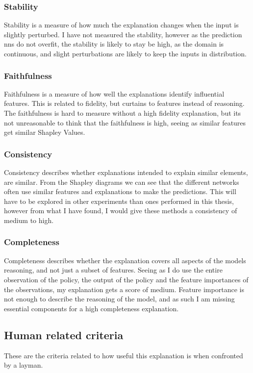 \documentclass[UKenglish]{uiomasterthesis}
\begin{document}
\subsubsection{Stability}
Stability is a measure of how much the explanation changes when the input is slightly perturbed. I have not measured the stability, however as the prediction \acp{nn} do not overfit, the stability is likely to stay be high, as the domain is continuous, and slight perturbations are likely to keep the inputs in distribution.

\subsubsection{Faithfulness}
Faithfulness is a measure of how well the explanations identify influential features. This is related to fidelity, but curtains to features instead of reasoning. The faithfulness is hard to measure without a high fidelity explanation, but its not unreasonable to think that the faithfulness is high, seeing as similar features get similar Shapley Values.


\subsubsection{Consistency}
Consistency describes whether explanations intended to explain similar elements, are similar. From the Shapley diagrams we can see that the different networks often use similar features and explanations to make the predictions. This will have to be explored in other experiments than ones performed in this thesis, however from what I have found, I would give these methods a consistency of medium to high.

\subsubsection{Completeness}
Completeness describes whether the explanation covers all aspects of the models reasoning, and not just a subset of features. Seeing as I do use the entire observation of the policy, the output of the policy and the feature importances of the observations, my explanation gets a score of medium. Feature importance is not enough to describe the reasoning of the model, and as such I am missing essential components for a high completeness explanation.

\subsection{Human related criteria}
These are the criteria related to how useful this explanation is when confronted by a layman.
\end{document}
